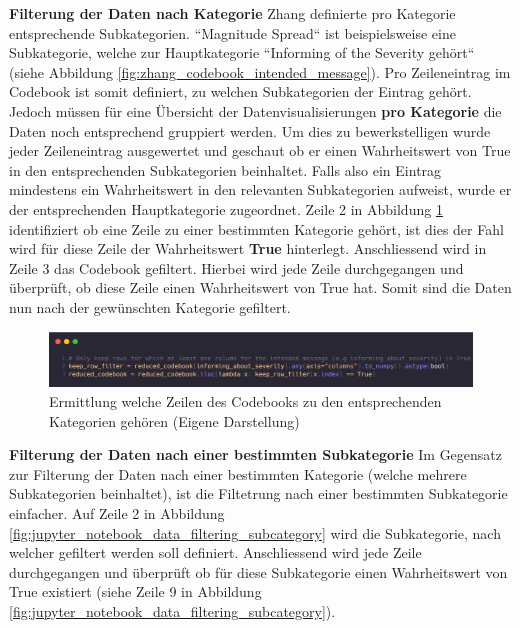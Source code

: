 \clearpage
\noindent
\textbf{Filterung der Daten nach Kategorie}
\newline
\indent
Zhang definierte pro Kategorie entsprechende Subkategorien. ``Magnitude Spread`` ist beispielsweise eine Subkategorie, welche zur Hauptkategorie ``Informing of the Severity gehört`` (siehe Abbildung \ref{fig:zhang_codebook_intended_message}). Pro Zeileneintrag im Codebook ist somit definiert, zu welchen Subkategorien der Eintrag gehört. Jedoch müssen für eine Übersicht der Datenvisualisierungen \textbf{pro Kategorie} die Daten noch entsprechend gruppiert werden. Um dies zu bewerkstelligen wurde jeder Zeileneintrag ausgewertet und geschaut ob er einen Wahrheitswert von True in den entsprechenden Subkategorien beinhaltet. Falls also ein Eintrag mindestens ein Wahrheitswert in den relevanten Subkategorien aufweist, wurde er der entsprechenden Hauptkategorie zugeordnet. Zeile 2 in Abbildung \ref{fig:jupyter_notebook_data_filtering} identifiziert ob eine Zeile zu einer bestimmten Kategorie gehört, ist dies der Fahl wird für diese Zeile der Wahrheitswert \textbf{True} hinterlegt.
Anschliessend wird in Zeile 3 das Codebook gefiltert. Hierbei wird jede Zeile durchgegangen und überprüft, ob diese Zeile einen Wahrheitswert von True hat. Somit sind die Daten nun nach der gewünschten Kategorie gefiltert.


 \begin{figure}[h]
    \includegraphics[width=14cm]{images/jupyter_notebook_data_filtering.png}
    \centering
    \caption{Ermittlung welche Zeilen des Codebooks zu den entsprechenden Kategorien gehören (Eigene Darstellung)}
    \label{fig:jupyter_notebook_data_filtering}
\end{figure}


\noindent
\textbf{Filterung der Daten nach einer bestimmten Subkategorie}
\newline
\indent
Im Gegensatz zur Filterung der Daten nach einer bestimmten Kategorie (welche mehrere Subkategorien beinhaltet), ist die Filtetrung nach einer bestimmten Subkategorie einfacher. Auf Zeile 2 in Abbildung \ref{fig:jupyter_notebook_data_filtering_subcategory} wird die Subkategorie, nach welcher gefiltert werden soll definiert. Anschliessend wird jede Zeile durchgegangen und überprüft ob für diese Subkategorie einen Wahrheitswert von True existiert (siehe Zeile 9 in Abbildung \ref{fig:jupyter_notebook_data_filtering_subcategory}).


